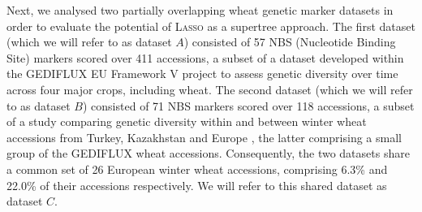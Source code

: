 Next, we analysed two partially overlapping wheat genetic marker datasets in
order to evaluate the potential of \textsc{Lasso} as a supertree approach. The
first dataset (which we will refer to as dataset $A$) consisted of 57 NBS
(Nucleotide Binding Site) markers scored over 411 accessions, a subset of a
dataset developed within the GEDIFLUX EU Framework V project \cite{gediflux}
to assess genetic diversity over time across four major crops, including
wheat. The second dataset (which we will refer to as dataset $B$) consisted of
71 NBS markers scored over 118 accessions, a subset of a study comparing
genetic diversity within and between winter wheat accessions from Turkey,
Kazakhstan and Europe \cite{muge}, the latter comprising a small group of the
GEDIFLUX wheat accessions. Consequently, the two datasets share a common set
of 26 European winter wheat accessions, comprising 6.3\% and 22.0\% of their
accessions respectively. We will refer to this shared dataset as dataset $C$.

